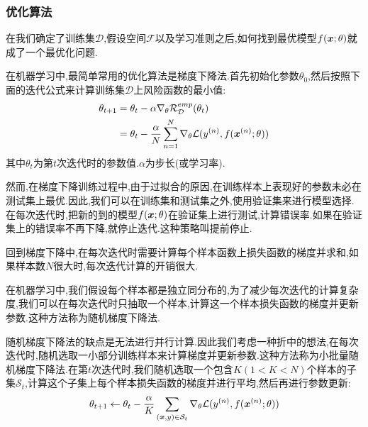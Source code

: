 \subsubsection{优化算法}
在我们确定了训练集$\mathcal{D}$,假设空间$\mathcal{F}$以及学习准则之后,如何找到最优模型$f(\bm{x};\theta)$就成了一个最优化问题.\par
在机器学习中,最简单常用的优化算法是梯度下降法.首先初始化参数$\theta_0$,然后按照下面的迭代公式来计算训练集$\mathcal{D}$上风险函数的最小值:
$$
\begin{aligned}
\theta_{t+1} & = \theta_t-\alpha\nabla_{\theta}\mathcal{R}^{emp}_{\mathcal{D}}(\theta_t)\\
             & = \theta_t-\frac{\alpha}{N}\sum_{n=1}^N\nabla_{\theta}\mathcal{L}(y^{(n)},f(\bm{x}^{(n)};\theta))
\end{aligned}
$$
其中$\theta_t$为第$t$次迭代时的参数值.$\alpha$为步长(或学习率).\par
然而,在梯度下降训练过程中,由于过拟合的原因,在训练样本上表现好的参数未必在测试集上最优.因此,我们可以在训练集和测试集之外,使用验证集来进行模型选择.在每次迭代时,把新的到的模型$f(\bm{x};\theta)$在验证集上进行测试,计算错误率.如果在验证集上的错误率不再下降,就停止迭代.这种策略叫提前停止.\par
回到梯度下降中,在每次迭代时需要计算每个样本函数上损失函数的梯度并求和,如果样本数$N$很大时,每次迭代计算的开销很大.\par
在机器学习中,我们假设每个样本都是独立同分布的,为了减少每次迭代的计算复杂度,我们可以在每次迭代时只抽取一个样本,计算这一个样本损失函数的梯度并更新参数.这种方法称为随机梯度下降法.\par
随机梯度下降法的缺点是无法进行并行计算.因此我们考虑一种折中的想法,在每次迭代时,随机选取一小部分训练样本来计算梯度并更新参数.这种方法称为小批量随机梯度下降法.在第$t$次迭代时,我们随机选取一个包含$K(1<K<N)$个样本的子集$\mathcal{S}_t$,计算这个子集上每个样本损失函数的梯度并进行平均,然后再进行参数更新:
$$
\theta_{t+1}\leftarrow \theta_t-\frac{\alpha}{K}\sum_{(\bm{x},y)\in\mathcal{S}_t}\nabla_{\theta}\mathcal{L}(y^{(n)},f(\bm{x}^{(n)};\theta))
$$
